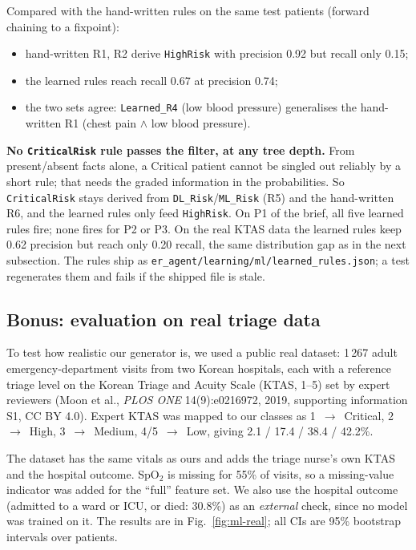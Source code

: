 \noindent Compared with the hand-written rules on the same test patients (forward chaining to a fixpoint):
\begin{itemize}
  \item hand-written R1, R2 derive \texttt{HighRisk} with precision 0.92 but recall only 0.15;
  \item the learned rules reach recall 0.67 at precision 0.74;
  \item the two sets agree: \texttt{Learned\_R4} (low blood pressure) generalises the hand-written R1
  (chest pain $\land$ low blood pressure).
\end{itemize}
\textbf{No \texttt{CriticalRisk} rule passes the filter, at any tree depth.} From present/absent facts alone, a
Critical patient cannot be singled out reliably by a short rule; that needs the graded information in the
probabilities. So \texttt{CriticalRisk} stays derived from \texttt{DL\_Risk}/\texttt{ML\_Risk} (R5) and the
hand-written R6, and the learned rules only feed \texttt{HighRisk}. On P1 of the brief, all five learned rules
fire; none fires for P2 or P3. On the real KTAS data the learned rules keep 0.62 precision but reach only 0.20
recall, the same distribution gap as in the next subsection.
The rules ship as \texttt{er\_agent/learning/ml/learned\_rules.json}; a test regenerates them and fails if the
shipped file is stale.

\subsection{Bonus: evaluation on real triage data}

To test how realistic our generator is, we used a public real dataset: 1\,267 adult emergency-department
visits from two Korean hospitals, each with a reference triage level on the Korean Triage and Acuity Scale
(KTAS, 1--5) set by expert reviewers (Moon et al., \textit{PLOS ONE} 14(9):e0216972, 2019, supporting
information S1, CC BY 4.0). Expert KTAS was mapped to our classes as 1~$\to$~Critical, 2~$\to$~High,
3~$\to$~Medium, 4/5~$\to$~Low, giving 2.1 / 17.4 / 38.4 / 42.2\%.

The dataset has the same vitals as ours and adds the triage nurse's own KTAS and the hospital outcome. SpO$_2$
is missing for 55\% of visits, so a missing-value indicator was added for the ``full'' feature set. We also use
the hospital outcome (admitted to a ward or ICU, or died: 30.8\%) as an \emph{external} check, since no model
was trained on it. The results are in Fig.~\ref{fig:ml-real}; all CIs are 95\% bootstrap intervals over
patients.

